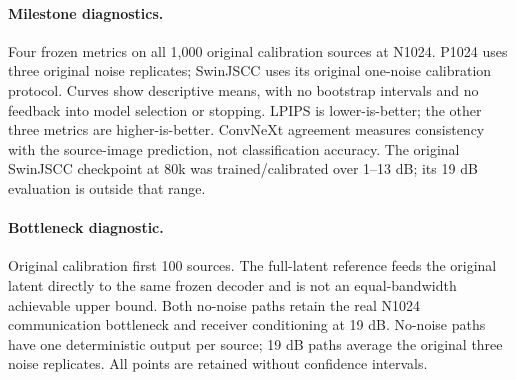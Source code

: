 \paragraph{Milestone diagnostics.} Four frozen metrics on all 1,000 original calibration sources at N1024. P1024 uses three original noise replicates; SwinJSCC uses its original one-noise calibration protocol. Curves show descriptive means, with no bootstrap intervals and no feedback into model selection or stopping. LPIPS is lower-is-better; the other three metrics are higher-is-better. ConvNeXt agreement measures consistency with the source-image prediction, not classification accuracy. The original SwinJSCC checkpoint at 80k was trained/calibrated over 1--13 dB; its 19 dB evaluation is outside that range.

\paragraph{Bottleneck diagnostic.} Original calibration first 100 sources. The full-latent reference feeds the original latent directly to the same frozen decoder and is not an equal-bandwidth achievable upper bound. Both no-noise paths retain the real N1024 communication bottleneck and receiver conditioning at 19 dB. No-noise paths have one deterministic output per source; 19 dB paths average the original three noise replicates. All points are retained without confidence intervals.
